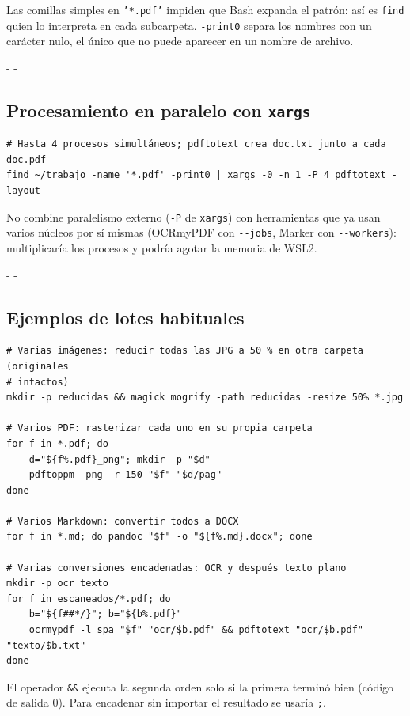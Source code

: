 \documentclass[11pt,a4paper]{article}
\makeatletter
\newcommand{\necesitaespacio}[1]{\par\penalty-100\begingroup
	\setlength{\dimen@}{#1}\dimen@ii\pagegoal\advance\dimen@ii-\pagetotal
	\ifdim\dimen@>\dimen@ii\ifdim\dimen@ii>\z@\vfil\fi\penalty-\@M\fi\endgroup}
\newcommand{\cmd}[1]{\texttt{\textcolor{colcmd}{#1}}}      %
\newcommand{\opt}[1]{\texttt{\textcolor{colopt}{#1}}}      %
\makeatother
\begin{document}
	Las comillas simples en \texttt{'*.pdf'} impiden que Bash expanda el patrón: así es \cmd{find} quien lo interpreta en cada subcarpeta. \opt{-print0} separa los nombres con un carácter nulo, el único que no puede aparecer en un nombre de archivo.
	
	\necesitaespacio{8\baselineskip}
	\subsection{Procesamiento en paralelo con \texttt{xargs}}
	
	\begin{lstlisting}
# Hasta 4 procesos simultáneos; pdftotext crea doc.txt junto a cada doc.pdf
find ~/trabajo -name '*.pdf' -print0 | xargs -0 -n 1 -P 4 pdftotext -layout
\end{lstlisting}
	
	\begin{advertencia}
		No combine paralelismo externo (\opt{-P} de \cmd{xargs}) con herramientas que ya usan varios núcleos por sí mismas (OCRmyPDF con \opt{-{}-jobs}, Marker con \opt{-{}-workers}): multiplicaría los procesos y podría agotar la memoria de WSL2.
	\end{advertencia}
	
	\necesitaespacio{8\baselineskip}
	\subsection{Ejemplos de lotes habituales}
	
	\begin{lstlisting}
# Varias imágenes: reducir todas las JPG a 50 % en otra carpeta (originales
# intactos)
mkdir -p reducidas && magick mogrify -path reducidas -resize 50% *.jpg

# Varios PDF: rasterizar cada uno en su propia carpeta
for f in *.pdf; do
    d="${f%.pdf}_png"; mkdir -p "$d"
    pdftoppm -png -r 150 "$f" "$d/pag"
done

# Varios Markdown: convertir todos a DOCX
for f in *.md; do pandoc "$f" -o "${f%.md}.docx"; done

# Varias conversiones encadenadas: OCR y después texto plano
mkdir -p ocr texto
for f in escaneados/*.pdf; do
    b="${f##*/}"; b="${b%.pdf}"
    ocrmypdf -l spa "$f" "ocr/$b.pdf" && pdftotext "ocr/$b.pdf" "texto/$b.txt"
done
\end{lstlisting}
	
	El operador \texttt{\&\&} ejecuta la segunda orden solo si la primera terminó bien (código de salida 0). Para encadenar sin importar el resultado se usaría \texttt{;}.
	\clearpage
\end{document}
